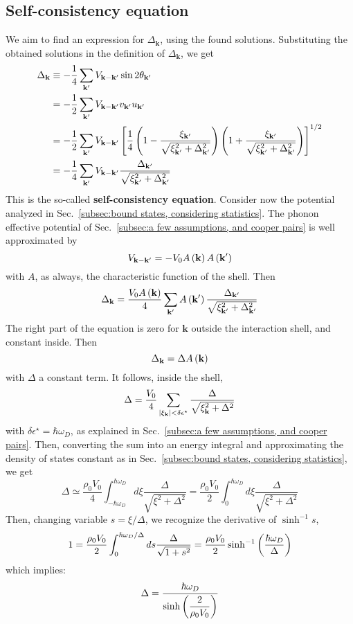 \subsection{Self-consistency equation}

We aim to find an expression for $\Delta_\mathbf{k}$, using the found solutions. Substituting the obtained solutions in the definition of $\Delta_\mathbf{k}$, we get
\[
\begin{aligned}
	\Delta_\mathbf{k} &\equiv - \frac{1}{4} 
	\sum_{\mathbf{k}'} V_{\mathbf{k}-\mathbf{k}'} \sin2\theta_{\mathbf{k}'} \\
	&= - \frac{1}{2} 
	\sum_{\mathbf{k}'} V_{\mathbf{k}-\mathbf{k}'} v_{\mathbf{k}'} u_{\mathbf{k}'} \\
	&= - \frac{1}{2} 
	\sum_{\mathbf{k}'} V_{\mathbf{k}-\mathbf{k}'} \left[{\frac{1}{4} \left({1 - \frac{\xi_{\mathbf{k}'}}{\sqrt{\xi_{\mathbf{k}'}^2 + \Delta_{\mathbf{k}'}^2}}}\right) \left({1 + \frac{\xi_{\mathbf{k}'}}{\sqrt{\xi_{\mathbf{k}'}^2 + \Delta_{\mathbf{k}'}^2}}}\right) }\right]^{1/2} \\
	&= - \frac{1}{4} \sum_{\mathbf{k}'} V_{\mathbf{k}-\mathbf{k}'} \frac{\Delta_{\mathbf{k}'}}{\sqrt{\xi_{\mathbf{k}'}^2 + \Delta_{\mathbf{k}'}^2}}
\end{aligned}
\]
This is the so-called \textbf{self-consistency equation}.
Consider now the potential analyzed in Sec.~\ref{subsec:bound states, considering statistics}. The phonon effective potential of Sec.~\ref{subsec:a few assumptions, and cooper pairs} is well approximated by
\[
	V_{\mathbf{k}-\mathbf{k}'} = - V_0 A\left({\mathbf{k}}\right) A\left({\mathbf{k}'}\right)
\]
with $A$, as always, the characteristic function of the shell. Then
\[
	\Delta_\mathbf{k} = \frac{V_0 A\left({\mathbf{k}}\right)}{4} \sum_{\mathbf{k}'} A\left({\mathbf{k}'}\right) \frac{\Delta_{\mathbf{k}'}}{\sqrt{\xi_{\mathbf{k}'}^2 + \Delta_{\mathbf{k}'}^2}}
\]
The right part of the equation is zero for $\mathbf{k}$ outside the interaction shell, and constant inside. Then
\[
	\Delta_\mathbf{k} = \Delta A\left({\mathbf{k}}\right)
\]
with $\Delta$ a constant term. It follows, inside the shell,
\[
	\Delta = \frac{V_0}{4} \sum_{\abs{\xi_\mathbf{k}}<\delta\epsilon^\star} \frac{\Delta}{\sqrt{\xi_\mathbf{k}^2 + \Delta^2}}
\]
with $\delta\epsilon^\star = \hbar\omega_D$, as explained in Sec.~\ref{subsec:a few assumptions, and cooper pairs}. Then, converting the sum into an energy integral and approximating the density of states constant as in Sec.~\ref{subsec:bound states, considering statistics}, we get
\[
	\Delta \simeq \frac{\rho_0 V_0}{4} \int_{-\hbar\omega_D}^{\hbar\omega_D} d\xi \frac{\Delta}{\sqrt{\xi^2 + \Delta^2}} = \frac{\rho_0 V_0}{2} \int_0^{\hbar\omega_D} d\xi \frac{\Delta}{\sqrt{\xi^2 + \Delta^2}}
\]
Then, changing variable $s=\xi/\Delta$, we recognize the derivative of $\sinh^{-1} s$,
\[
	1 = \frac{\rho_0 V_0}{2} \int_0^{\hbar\omega_D/\Delta} ds \frac{\Delta}{\sqrt{1 + s^2}} = \frac{\rho_0 V_0}{2} \sinh^{-1} \left({\frac{\hbar\omega_D}{\Delta}}\right)
\]
which implies:
\[
	\Delta = \frac{\hbar\omega_D}{\displaystyle
		\sinh\left({\frac{2}{\rho_0 V_0}}\right)
	}
\]

